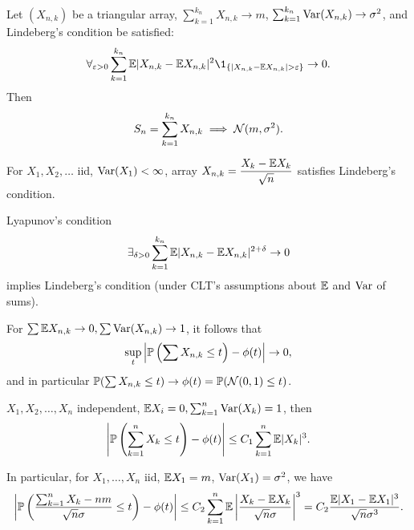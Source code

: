 



	\begin{theorem}
		Let $(X_{n,k})$ be a triangular array,
		$\sum_{k=1}^{k_n} X_{n,k} \to m$, $\sum_{k=1}^{k_n} \var(X_{n,k}) \to \sigma^2$,
		and Lindeberg's condition be satisfied:
		$$ \forall_{\varepsilon>0} \sum_{k=1}^{k_n} \E |X_{n,k} - \E X_{n,k} |^2 \1_{\{ |X_{n,k} - \E X_{n,k} | > \varepsilon \}} \to 0.$$
		Then $$S_n = \sum_{k=1}^{k_n} X_{n,k} \implies \N(m, \sigma^2).$$
	\end{theorem}
	
	\begin{proposition}
		For $X_1, X_2, \ldots$ iid, $\var(X_1)<\infty$,
		array $\displaystyle X_{n,k} = \frac{X_k - \E X_k}{\sqrt{n}}$
		satisfies Lindeberg's condition.
	\end{proposition}
	
	\begin{proposition}
		Lyapunov's condition
		$$ \exists_{\delta>0} \sum_{k=1}^{k_n}
			\E |X_{n,k} - \E X_{n,k} |^{2 + \delta} \to 0 $$
		implies Lindeberg's condition (under CLT's assumptions about $\E$ and $\var$ of sums).
	\end{proposition}
	
	\begin{corollary}
		For $\sum \E X_{n,k} \to 0, \sum \var(X_{n,k}) \to 1$,
		it follows that $$ \sup_t \left| \P\left(\sum X_{n,k} \leq t\right)
			- \phi(t)\right| \to 0,$$
		and in particular $\P(\sum X_{n,k} \leq t) \to \phi(t) = \P(\N(0,1) \leq t)$.
	\end{corollary}
	
	\begin{theorem}
		$X_1, X_2, \ldots, X_n$ independent, $\E X_i = 0, \sum_{k=1}^n \var(X_k) = 1$, then
		$$\left| \P\left(\sum_{k=1}^n X_k \leq t\right) - \phi(t) \right|
		\leq C_1 \sum_{k=1}^n \E |X_k|^3.$$
	\end{theorem}
	
	\begin{corollary}
		In particular, for $X_1, \ldots, X_n$ iid, $\E X_1 = m$,
		$\var(X_1) = \sigma^2$, we have
		$$\left| \P\left(\frac{\sum_{k=1}^n X_k - nm}{\sqrt{n} \sigma} \leq t \right)
				- \phi(t) \right|
		\leq C_2 \sum_{k=1}^n \E \left| \frac{X_k - \E X_k}{\sqrt{n}\sigma}\right|^3
		= C_2 \frac{\E |X_1 - \E X_1|^3}{\sqrt{n} \sigma^3}.$$
	\end{corollary}
	

